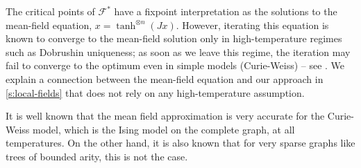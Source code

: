 \documentclass[11pt, oneside, english]{article}
\newcommand{\F}{\mathcal{F}}
\theoremstyle{definition}
\theoremstyle{plain}
\begin{document}
The critical points of $\F^*$ have a fixpoint interpretation as the solutions to the mean-field equation, $x = \tanh^{\otimes n}(J x)$. However, iterating this equation is known to converge to the mean-field solution only in high-temperature regimes such as Dobrushin uniqueness; as soon as we leave this regime, the iteration may fail to converge to the optimum even in simple models (Curie-Weiss) -- see \cite{jain2018mean}. We explain a connection between the mean-field equation and our approach in \cref{s:local-fields} that does not rely on any high-temperature assumption.

It is well known \cite{ellis-newman} that the mean field approximation
is very accurate for the Curie-Weiss model, which is the Ising
model on the complete graph, at all temperatures. On the other hand, it is also known \cite{DemboMontanari:10} that for very sparse graphs like trees of bounded arity, this is not the case. 
\end{document}
